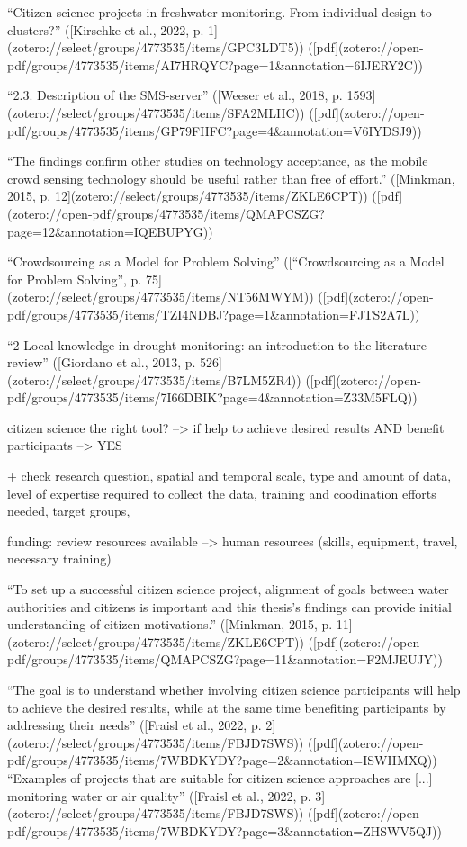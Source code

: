 {“Citizen science projects in freshwater monitoring. From individual design to clusters?” ([Kirschke et al., 2022, p. 1](zotero://select/groups/4773535/items/GPC3LDT5)) ([pdf](zotero://open-pdf/groups/4773535/items/AI7HRQYC?page=1&annotation=6IJERY2C))

“2.3. Description of the SMS-server” ([Weeser et al., 2018, p. 1593](zotero://select/groups/4773535/items/SFA2MLHC)) ([pdf](zotero://open-pdf/groups/4773535/items/GP79FHFC?page=4&annotation=V6IYDSJ9))

“The findings confirm other studies on technology acceptance, as the mobile crowd sensing technology should be useful rather than free of effort.” ([Minkman, 2015, p. 12](zotero://select/groups/4773535/items/ZKLE6CPT)) ([pdf](zotero://open-pdf/groups/4773535/items/QMAPCSZG?page=12&annotation=IQEBUPYG))


“Crowdsourcing as a Model for Problem Solving” ([“Crowdsourcing as a Model for Problem Solving”, p. 75](zotero://select/groups/4773535/items/NT56MWYM)) ([pdf](zotero://open-pdf/groups/4773535/items/TZI4NDBJ?page=1&annotation=FJTS2A7L))

“2 Local knowledge in drought monitoring: an introduction to the literature review” ([Giordano et al., 2013, p. 526](zotero://select/groups/4773535/items/B7LM5ZR4)) ([pdf](zotero://open-pdf/groups/4773535/items/7I66DBIK?page=4&annotation=Z33M5FLQ))

citizen science the right tool?
--> if help to achieve desired results AND benefit participants --> YES

+ check research question, spatial and temporal scale, type and amount of data, level of expertise required to collect the data, training and coodination efforts needed, target groups, 

funding: review resources available --> human resources (skills, equipment, travel, necessary training)

“To set up a successful citizen science project, alignment of goals between water authorities and citizens is important and this thesis’s findings can provide initial understanding of citizen motivations.” ([Minkman, 2015, p. 11](zotero://select/groups/4773535/items/ZKLE6CPT)) ([pdf](zotero://open-pdf/groups/4773535/items/QMAPCSZG?page=11&annotation=F2MJEUJY))
% 

“The goal is to understand whether involving citizen science participants will help to achieve the desired results, while at the same time benefiting participants by addressing their needs” ([Fraisl et al., 2022, p. 2](zotero://select/groups/4773535/items/FBJD7SWS)) ([pdf](zotero://open-pdf/groups/4773535/items/7WBDKYDY?page=2&annotation=ISWIIMXQ))
“Examples of projects that are suitable for citizen science approaches are [...] monitoring water or air quality” ([Fraisl et al., 2022, p. 3](zotero://select/groups/4773535/items/FBJD7SWS)) ([pdf](zotero://open-pdf/groups/4773535/items/7WBDKYDY?page=3&annotation=ZHSWV5QJ))

}
